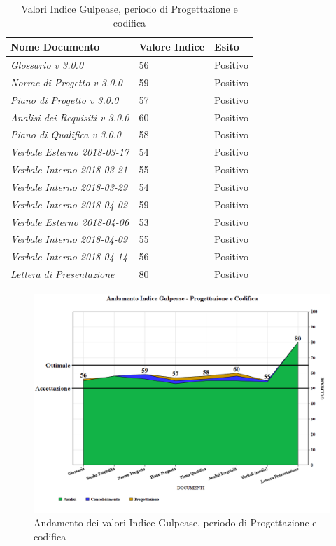 \documentclass[openany,12pt,a4paper]{report}
\begin{document}
\begin{itemize}
	\begin{table}[h]
		\begin{center}
			\setlength\LTleft{6mm}
			\begin{longtable}{|p{60mm}|p{30mm}|p{25mm}|}
				\hline  
				\textbf{Nome Documento} & \textbf{Valore Indice} & \textbf{Esito} \\ \hline    
				\textit{Glossario v 3.0.0} & 56 & Positivo\\ \hline    
				\textit{Norme di Progetto v 3.0.0} & 59 & Positivo\\ \hline    
				\textit{Piano di Progetto v 3.0.0} & 57 & Positivo\\ \hline    
				\textit{Analisi dei Requisiti v 3.0.0} & 60 & Positivo\\ \hline    
				\textit{Piano di Qualifica v 3.0.0} & 58 & Positivo\\ \hline    
				\textit{Verbale Esterno 2018-03-17} & 54 & Positivo\\ \hline
				\textit{Verbale Interno 2018-03-21} & 55 & Positivo\\ \hline
				\textit{Verbale Interno 2018-03-29} & 54 & Positivo\\ \hline
				\textit{Verbale Interno 2018-04-02} & 59 & Positivo\\ \hline
				\textit{Verbale Esterno 2018-04-06} & 53 & Positivo\\ \hline    
				\textit{Verbale Interno 2018-04-09} & 55 & Positivo\\ \hline
				\textit{Verbale Interno 2018-04-14} & 56 & Positivo\\ \hline
				\textit{Lettera di Presentazione} & 80 & Positivo\\ \hline
			\end{longtable}
		\end{center}
		\caption{Valori Indice Gulpease, periodo di Progettazione e codifica} 
	\end{table} 
	
	\begin{figure}[H]
		\includegraphics[scale=0.5]{verifica-progettazione-gulpease}
		\centering
		\caption{Andamento dei valori Indice Gulpease, periodo di Progettazione e codifica}
	\end{figure}
	

\end{itemize}
\end{document}
